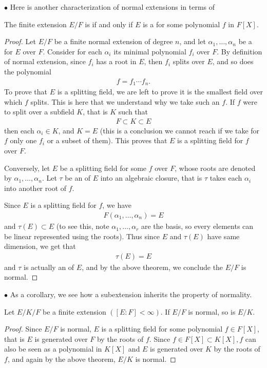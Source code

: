 \documentclass{article}
\begin{document}
$\bullet$ Here is another characterization of normal extensions in terms of 

\begin{thma}\label{thm:oneqdcer}
The finite extension $E / F$ is  if and only if $E$ is a  for some polynomial $f$ in $F[X]$.
\end{thma} 
\begin{proof}
Let $E / F$ be a finite normal extension of degree $n$, and let $\alpha_{1}, \ldots, \alpha_{n}$ be a  for $E$ over $F$. Consider for each $\alpha_{i}$ its minimal polynomial $f_{i}$ over $F$. By definition of normal extension, since $f_{i}$ has a root in $E$, then $f_{i}$ splits over $E$, and so does the polynomial
\begin{align*}
f=f_{1} \cdots f_{n} .
\end{align*}
To prove that $E$ is a splitting field, we are left to prove it is the smallest field over which $f$ splits. This is here that we understand why we take such an $f$. If $f$ were to split over a subfield $K$, that is $K$ such that
\begin{align*}
F \subset K \subset E
\end{align*}
then each $\alpha_{i} \in K$, and $K=E$ (this is a conclusion we cannot reach if we take for $f$ only one $f_{i}$ or a subset of them). This proves that $E$ is a splitting field for $f$ over $F$.

Conversely, let $E$ be a splitting field for some $f$ over $F$, whose roots are denoted by $\alpha_{1}, \ldots, \alpha_{n}$. Let $\tau$ be an  of $E$ into an algebraic closure, that is $\tau$ takes each $\alpha_{i}$ into another root of $f$.

Since $E$ is a splitting field for $f$, we have
\begin{align*}
F\left(\alpha_{1}, \ldots, \alpha_{n}\right)=E
\end{align*}
and $\tau(E) \subset E$ (to see this, note $\alpha_1,\ldots,\alpha_r$ are the basis, so every elements can be linear represented using the roots). Thus since $E$ and $\tau(E)$ have same dimension, we get that
\begin{align*}
\tau(E)=E
\end{align*}
and $\tau$ is actually an  of $E$, and by the above theorem, we conclude the $E / F$ is normal.
\end{proof} 


$\bullet$ As a corollary, we see how a subextension inherits the property of normality.
\begin{cora}\label{cor:oionqdx}
Let $E / K / F$ be a finite extension $([E: F]<\infty)$. If $E / F$ is normal, so is $E / K$.
\end{cora}
\begin{proof}
Since $E / F$ is normal, $E$ is a splitting field for some polynomial $f \in F[X]$, that is $E$ is generated over $F$ by the roots of $f$. Since $f \in F[X] \subset K[X], f$ can also be seen as a polynomial in $K[X]$ and $E$ is generated over $K$ by the roots of $f$, and again by the above theorem, $E / K$ is normal.
\end{proof} 
\end{document}
